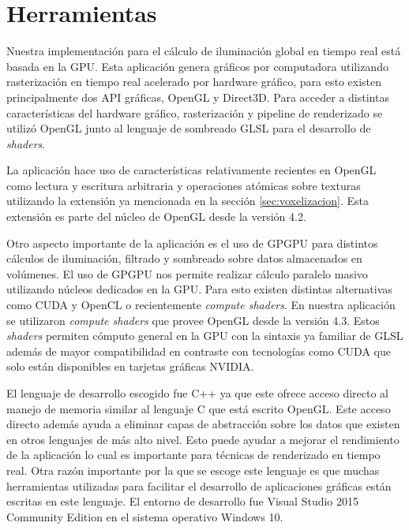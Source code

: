 \section{Herramientas}
Nuestra implementación para el cálculo de iluminación global en tiempo real está basada en la \ac{GPU}. Esta aplicación genera gráficos por computadora utilizando rasterización en tiempo real acelerado por hardware gráfico, para esto existen principalmente dos API gráficas, OpenGL y Direct3D. Para acceder a distintas características del hardware gráfico, rasterización y pipeline de renderizado se utilizó OpenGL junto al lenguaje de sombreado GLSL para el desarrollo de \emph{shaders}. 

La aplicación hace uso de características relativamente recientes en OpenGL como lectura y escritura arbitraria y operaciones atómicas sobre texturas utilizando la extensión ya mencionada en la sección \ref{sec:voxelizacion}. Esta extensión es parte del núcleo de OpenGL desde la versión 4.2. 

Otro aspecto importante de la aplicación es el uso de \ac{GPGPU} para distintos cálculos de iluminación, filtrado y sombreado sobre datos almacenados en volúmenes. El uso de \ac{GPGPU} nos permite realizar cálculo paralelo masivo utilizando núcleos dedicados en la \ac{GPU}. Para esto existen distintas alternativas como CUDA y OpenCL o recientemente \emph{compute shaders}. En nuestra aplicación se utilizaron \emph{compute shaders} que provee OpenGL desde la versión 4.3. Estos \emph{shaders} permiten cómputo general en la GPU con la sintaxis ya familiar de GLSL además de mayor compatibilidad en contraste con tecnologías como CUDA que solo están disponibles en tarjetas gráficas NVIDIA.

El lenguaje de desarrollo escogido fue C++ ya que este ofrece acceso directo al manejo de memoria similar al lenguaje C que está escrito OpenGL. Este acceso directo además ayuda a eliminar capas de abstracción sobre los datos que existen en otros lenguajes de más alto nivel. Esto puede ayudar a mejorar el rendimiento de la aplicación lo cual es importante para técnicas de renderizado en tiempo real. Otra razón importante por la que se escoge este lenguaje es que muchas herramientas utilizadas para facilitar el desarrollo de aplicaciones gráficas están escritas en este lenguaje. El entorno de desarrollo fue Visual Studio 2015 Community Edition en el sistema operativo Windows 10.

